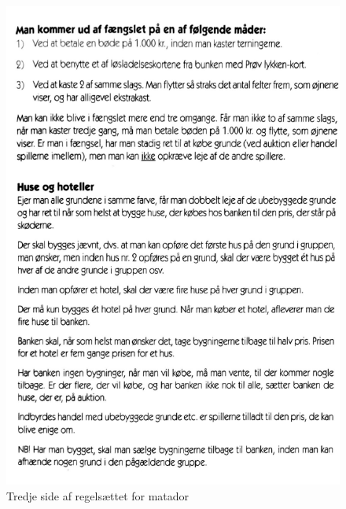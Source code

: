 \begin{flushleft}
\begin{figure}[H]
    \includegraphics[width=14cm]{Report/figures/MatadorRegler3.PNG}
    \caption{Tredje side af regelsættet for matador}
    \label{MatadorRules3}
\end{figure}
\begin{figure}[H] %
    \centering

\end{figure}
\end{flushleft}
